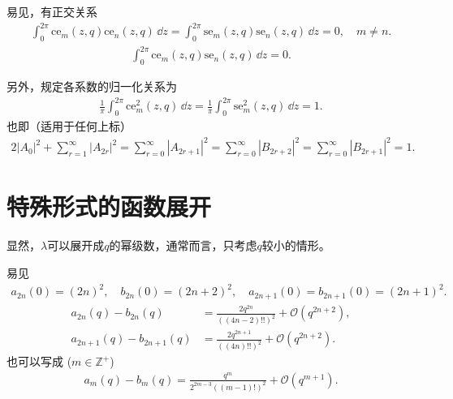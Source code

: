 易见，有正交关系
\begin{align*}
	\int_{0}^{2\pi} \mathrm{ce}_m(z, q) \mathrm{ce}_n(z, q) \,\dd z = \int_{0}^{2\pi} \mathrm{se}_m(z, q) \mathrm{se}_n(z, q) \,\dd z = 0, \quad m \neq n.
\end{align*}
\begin{align*}
	\int_{0}^{2\pi} \mathrm{ce}_m(z, q) \mathrm{se}_n(z, q) \,\dd z = 0.
\end{align*}

另外，规定各系数的归一化关系为
\begin{align*}
	\frac{1}{\pi} \int_{0}^{2\pi} \mathrm{ce}_m^2(z, q) \,\dd z = \frac{1}{\pi} \int_{0}^{2\pi} \mathrm{se}_m^2(z, q) \,\dd z = 1.
\end{align*}
也即（适用于任何上标）
\begin{align*}
	2|A_0|^2 + \sum_{r=1}^{\infty} |A_{2r}|^2 = \sum_{r=0}^{\infty} |A_{2r+1}|^2 = \sum_{r=0}^{\infty} |B_{2r+2}|^2 = \sum_{r=0}^{\infty} |B_{2r+1}|^2 = 1.
\end{align*}

\section{特殊形式的函数展开}
显然，\(\lambda\)可以展开成\(q\)的幂级数，通常而言，只考虑\(q\)较小的情形。

易见
\begin{align*}
	a_{2n}(0) = (2n)^2, \quad b_{2n}(0) = (2n + 2)^2, \quad a_{2n+1}(0) = b_{2n+1}(0) = (2n+1)^2.
\end{align*}
\begin{align*}
	a_{2n}(q) - b_{2n}(q)     & = \frac{2q^{2n}}{((4n - 2)!!)^2} + \mathcal{O}(q^{2n+2}), \\
	a_{2n+1}(q) - b_{2n+1}(q) & = \frac{2q^{2n+1}}{((4n)!!)^2} + \mathcal{O}(q^{2n+2}).
\end{align*}
也可以写成 (\(m \in \mathbb{Z}^+\))
\begin{align*}
	a_m(q) - b_m(q) = \frac{q^m}{2^{2m-3}((m - 1)!)^2} + \mathcal{O}(q^{m+1}).
\end{align*}

